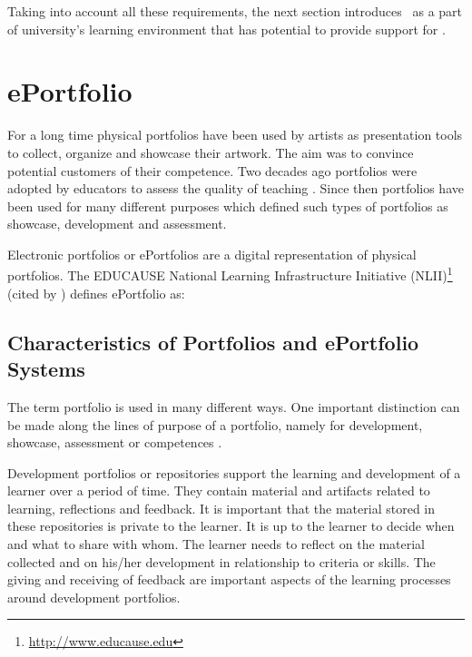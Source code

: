 Taking into account all these requirements, the next section introduces \ep~as a
part of university's learning environment that has potential to provide support
for \LLLsn.

\section{ePortfolio}
For a long time physical portfolios have been used by artists as presentation
tools to collect, organize and showcase their artwork. The aim was to convince
potential customers of their competence. Two decades ago portfolios were adopted
by educators to assess the quality of teaching \citep{VanTartwijkJ.2004}. Since
then portfolios have been used for many different purposes which defined such
types of portfolios as showcase, development and assessment.
 
Electronic portfolios or ePortfolios are a digital representation of physical
portfolios. The EDUCAUSE National Learning Infrastructure Initiative
(NLII)\footnote{\url{http://www.educause.edu}} (cited by
\citealp{IMSGlobalLearningConsortium2005}) defines ePortfolio as:


\subsection{Characteristics of Portfolios and ePortfolio Systems}
The term portfolio is used in many different ways. One important distinction can
be made along the lines of purpose of a portfolio, namely for development,
showcase, assessment or competences \citep{VanTartwijkJ.2004}. 

Development portfolios or repositories support the learning and development of a
learner over a period of time. They contain material and artifacts related to
learning, reflections and feedback. It is important that the material stored in
these repositories is private to the learner. It is up to the learner to decide
when and what to share with whom. The learner needs to reflect on the material
collected and on his/her development in relationship to criteria or skills. The
giving and receiving of feedback are important aspects of the learning processes
around development portfolios.

